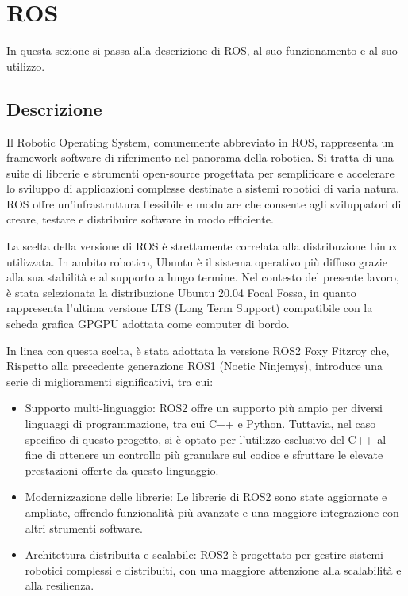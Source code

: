 \section{ROS}
In questa sezione si passa alla descrizione di ROS, al suo funzionamento e al suo utilizzo.

\subsection{Descrizione}
Il Robotic Operating System, comunemente abbreviato in ROS, rappresenta un framework software di riferimento nel panorama della robotica. Si tratta di una suite di librerie e strumenti open-source progettata per semplificare e accelerare lo sviluppo di applicazioni complesse destinate a sistemi robotici di varia natura. ROS offre un'infrastruttura flessibile e modulare che consente agli sviluppatori di creare, testare e distribuire software in modo efficiente.

\noindent La scelta della versione di ROS è strettamente correlata alla distribuzione Linux utilizzata. In ambito robotico, Ubuntu è il sistema operativo più diffuso grazie alla sua stabilità e al supporto a lungo termine. Nel contesto del presente lavoro, è stata selezionata la distribuzione Ubuntu 20.04 Focal Fossa, in quanto rappresenta l'ultima versione LTS (Long Term Support) compatibile con la scheda grafica GPGPU adottata come computer di bordo.

\noindent In linea con questa scelta, è stata adottata la versione ROS2 Foxy Fitzroy che, Rispetto alla precedente generazione ROS1 (Noetic Ninjemys), introduce una serie di miglioramenti significativi, tra cui:

\begin{itemize}
  \item Supporto multi-linguaggio: ROS2 offre un supporto più ampio per diversi linguaggi di programmazione, tra cui C++ e Python. Tuttavia, nel caso specifico di questo progetto, si è optato per l'utilizzo esclusivo del C++ al fine di ottenere un controllo più granulare sul codice e sfruttare le elevate prestazioni offerte da questo linguaggio.
  \item Modernizzazione delle librerie: Le librerie di ROS2 sono state aggiornate e ampliate, offrendo funzionalità più avanzate e una maggiore integrazione con altri strumenti software.
  \item Architettura distribuita e scalabile: ROS2 è progettato per gestire sistemi robotici complessi e distribuiti, con una maggiore attenzione alla scalabilità e alla resilienza.
\end{itemize}

